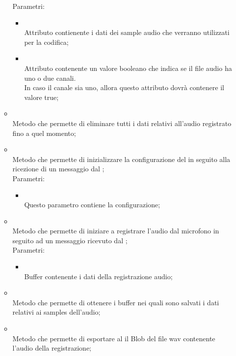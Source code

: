 \begin{itemize}
\begin{itemize}
		Parametri:
		\begin{itemize}
			\item {} \\
			Attributo contienente i dati dei sample audio che verranno utilizzati per la codifica;
			\item {} \\
			Attributo contenente un valore booleano che indica se il file audio ha uno o due canali. \\
In caso il canale sia uno, allora questo attributo dovrà contenere il valore true;
		\end{itemize}
		\item[]  \\		Metodo che permette di eliminare tutti i dati relativi all'audio registrato fino a quel momento;\\
		\item[]  \\		Metodo che permette di inizializzare la configurazione del  in seguito alla ricezione di un messaggio dal ;\\
		Parametri:
		\begin{itemize}
			\item {} \\
			Questo parametro contiene la configurazione;
		\end{itemize}
		\item[]  \\		Metodo che permette di iniziare a registrare l'audio dal microfono in seguito ad un messaggio ricevuto dal ;\\
		Parametri:
		\begin{itemize}
			\item {} \\
			Buffer contenente i dati della registrazione audio;
		\end{itemize}
		\item[]  \\		Metodo che permette di ottenere i buffer nei quali sono salvati i dati relativi ai samples dell'audio;\\
		\item[]  \\		Metodo che permette di esportare al  il Blob del file wav contenente l'audio della registrazione;\\

\end{itemize}
\end{itemize}
